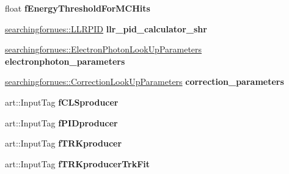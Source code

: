 \begin{DoxyCompactItemize}
\item 
float {\bfseries f\+Energy\+Threshold\+For\+M\+C\+Hits}\hypertarget{classselection_1_1CC0piNpSelection_a99895d76eae50c765fa1ac046d4bdedc}{}\label{classselection_1_1CC0piNpSelection_a99895d76eae50c765fa1ac046d4bdedc}

\item 
\hyperlink{classsearchingfornues_1_1LLRPID}{searchingfornues\+::\+L\+L\+R\+P\+ID} {\bfseries llr\+\_\+pid\+\_\+calculator\+\_\+shr}\hypertarget{classselection_1_1CC0piNpSelection_a9810f1a43b16f39021a80978df9682b7}{}\label{classselection_1_1CC0piNpSelection_a9810f1a43b16f39021a80978df9682b7}

\item 
\hyperlink{structsearchingfornues_1_1ElectronPhotonLookUpParameters}{searchingfornues\+::\+Electron\+Photon\+Look\+Up\+Parameters} {\bfseries electronphoton\+\_\+parameters}\hypertarget{classselection_1_1CC0piNpSelection_ad9e23a1e0f7318e83e1904bc0e377524}{}\label{classselection_1_1CC0piNpSelection_ad9e23a1e0f7318e83e1904bc0e377524}

\item 
\hyperlink{structsearchingfornues_1_1CorrectionLookUpParameters}{searchingfornues\+::\+Correction\+Look\+Up\+Parameters} {\bfseries correction\+\_\+parameters}\hypertarget{classselection_1_1CC0piNpSelection_a3f2b5ec710659b4a382ed3e74e5a671e}{}\label{classselection_1_1CC0piNpSelection_a3f2b5ec710659b4a382ed3e74e5a671e}

\item 
art\+::\+Input\+Tag {\bfseries f\+C\+L\+Sproducer}\hypertarget{classselection_1_1CC0piNpSelection_a3d64505ea3757aa3d729aca8e871cd95}{}\label{classselection_1_1CC0piNpSelection_a3d64505ea3757aa3d729aca8e871cd95}

\item 
art\+::\+Input\+Tag {\bfseries f\+P\+I\+Dproducer}\hypertarget{classselection_1_1CC0piNpSelection_a84fa0549ef1d05cdcbc93b8ab7f6613e}{}\label{classselection_1_1CC0piNpSelection_a84fa0549ef1d05cdcbc93b8ab7f6613e}

\item 
art\+::\+Input\+Tag {\bfseries f\+T\+R\+Kproducer}\hypertarget{classselection_1_1CC0piNpSelection_ac196a716edaba0c3fcc8f20c4ac1af61}{}\label{classselection_1_1CC0piNpSelection_ac196a716edaba0c3fcc8f20c4ac1af61}

\item 
art\+::\+Input\+Tag {\bfseries f\+T\+R\+Kproducer\+Trk\+Fit}\hypertarget{classselection_1_1CC0piNpSelection_a2a418cbcd9bdd0dc488a52af9d588abf}{}\label{classselection_1_1CC0piNpSelection_a2a418cbcd9bdd0dc488a52af9d588abf}


\end{DoxyCompactItemize}
